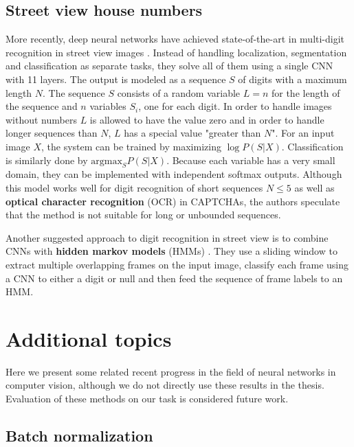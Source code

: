 \subsection{Street view house numbers}


More recently, deep neural networks have achieved state-of-the-art in multi-digit recognition in street view images \cite{multidigit_streetview}. Instead of handling localization, segmentation and classification as separate tasks, they solve all of them using a single CNN with 11 layers. The output is modeled as a sequence $S$ of digits with a maximum length $N$. The sequence $S$ consists of a random variable $L=n$ for the length of the sequence and $n$ variables $S_i$, one for each digit. In order to handle images without numbers $L$ is allowed to have the value zero and in order to handle longer sequences than $N$, $L$ has a special value "greater than $N$". For an input image $X$, the system can be trained by maximizing $\log P(S \vert X)$. Classification is similarly done by $\text{argmax}_S P(S \vert X)$.
Because each variable has a very small domain, they can be implemented with independent softmax outputs.
Although this model works well for digit recognition of short sequences $N \leq 5$ as well as \textbf{optical character recognition} (OCR) in CAPTCHAs, the authors speculate that the method is not suitable for long or unbounded sequences.

Another suggested approach to digit recognition in street view is to combine CNNs with \textbf{hidden markov models} (HMMs) \cite{multidigit_streetview_CNN_HMM}. They use a sliding window to extract multiple overlapping frames on the input image, classify each frame using a CNN to either a digit or null and then feed the sequence of frame labels to an HMM.


\section{Additional topics}
Here we present some related recent progress in the field of neural networks in computer vision, although we do not directly use these results in the thesis.
Evaluation of these methods on our task is considered future work.

\subsection{Batch normalization}

